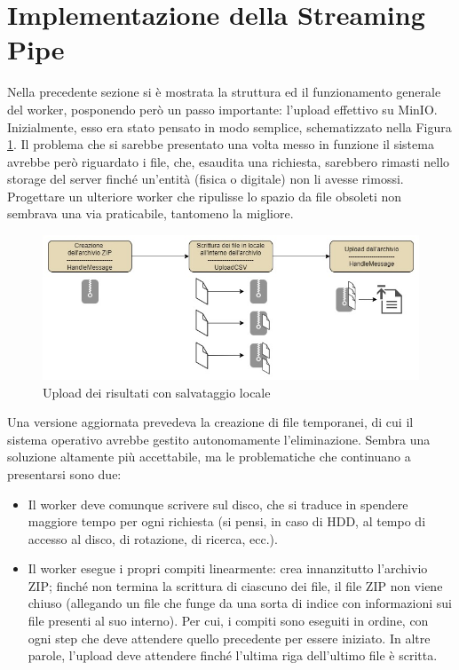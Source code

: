 \section{Implementazione della Streaming Pipe} \label{streamingpipe}
Nella precedente sezione si è mostrata la struttura ed il funzionamento generale del worker, posponendo però un passo importante: l'upload effettivo su MinIO. Inizialmente, esso era stato pensato in modo semplice, schematizzato nella Figura \ref{fig:salvataggiolocale}. Il problema che si sarebbe presentato una volta messo in funzione il sistema avrebbe però riguardato i file, che, esaudita una richiesta, sarebbero rimasti nello storage del server finché un'entità (fisica o digitale) non li avesse rimossi. Progettare un ulteriore worker che ripulisse lo spazio da file obsoleti non sembrava una via praticabile, tantomeno la migliore.
\begin{figure}[h!]
    \centering
    \includegraphics[width=\textwidth]{images/salvataggiolocale.jpg}
    \caption{Upload dei risultati con salvataggio locale}
    \label{fig:salvataggiolocale}
\end{figure}
Una versione aggiornata prevedeva la creazione di file temporanei, di cui il sistema operativo avrebbe gestito autonomamente l'eliminazione. Sembra una soluzione altamente più accettabile, ma le problematiche che continuano a presentarsi sono due: 
\begin{itemize}
    \item Il worker deve comunque scrivere sul disco, che si traduce in spendere maggiore tempo per ogni richiesta (si pensi, in caso di HDD, al tempo di accesso al disco, di rotazione, di ricerca, ecc.).
    \item Il worker esegue i propri compiti linearmente: crea innanzitutto l'archivio ZIP; finché non termina la scrittura di ciascuno dei file, il file ZIP non viene chiuso (allegando un file che funge da una sorta di indice con informazioni sui file presenti al suo interno). Per cui, i compiti sono eseguiti in ordine, con ogni step che deve attendere quello precedente per essere iniziato. In altre parole, l'upload deve attendere finché l'ultima riga dell'ultimo file è scritta. 
\end{itemize}
